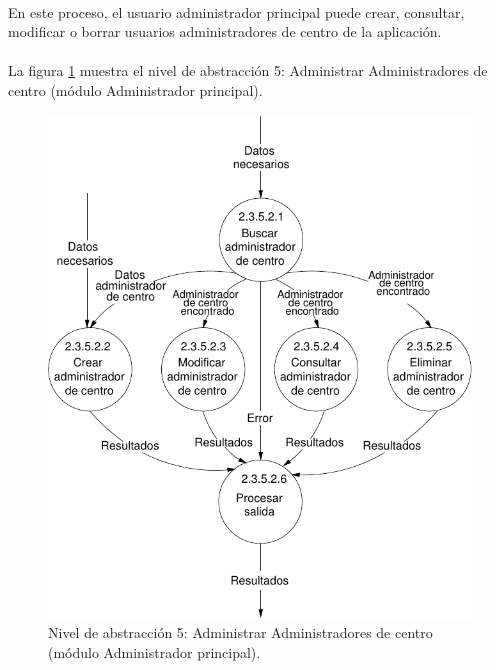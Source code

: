 \paragraph{}En este proceso, el usuario administrador principal puede crear,
consultar, modificar o borrar usuarios administradores de centro de la
aplicación.

\paragraph{}La figura \ref{diagramaNivel5-AdministrarAdministradoresCentro}
muestra el nivel de abstracción 5: Administrar Administradores de centro (módulo
Administrador principal).

  \begin{figure}[!ht]
    \begin{center}
      \includegraphics[]{08.Analisis_Funcional/8.2.DFDs/Niveles/Nivel5/AdministradorPrincipal/AdministrarUsuarios/AdministrarAdministradoresCentro/Diagramas/nivel5-AdministrarAdministradoresCentro.pdf}
      \caption{Nivel de abstracción 5: Administrar Administradores de centro
      (módulo Administrador principal).}
      \label{diagramaNivel5-AdministrarAdministradoresCentro}
    \end{center}
  \end{figure}
